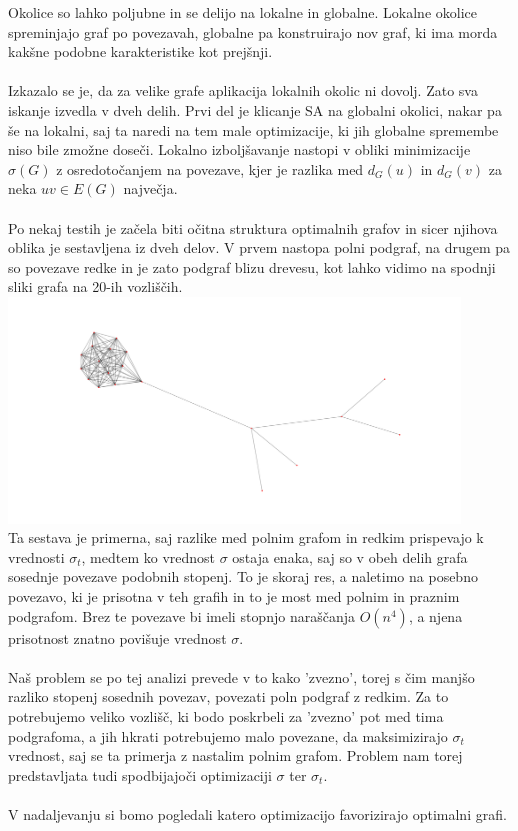 \documentclass[ letterpaper, titlepage, fleqn]{article}
\begin{document}
Okolice so lahko poljubne in se delijo na lokalne in globalne.
Lokalne okolice spreminjajo graf po povezavah, globalne pa
konstruirajo nov graf, ki ima morda kakšne podobne karakteristike kot prejšnji.
\\\\
Izkazalo se je, da za velike grafe aplikacija lokalnih okolic ni dovolj. Zato
sva iskanje izvedla v dveh delih. Prvi del je klicanje SA na globalni okolici, nakar
pa še na lokalni, saj ta naredi na tem male optimizacije, ki jih globalne spremembe 
niso bile zmožne doseči.
Lokalno izboljšavanje nastopi v obliki minimizacije $\sigma(G)$ z osredotočanjem na
povezave, kjer je razlika med $d_G(u)$ in $d_G(v)$ za neka $uv \in E(G)$ največja.
\\\\
Po nekaj testih je začela biti očitna struktura optimalnih grafov in sicer
njihova oblika je sestavljena iz dveh delov. V prvem nastopa polni podgraf, 
na drugem pa so povezave redke in je zato podgraf blizu drevesu, kot lahko 
vidimo na spodnji sliki grafa na 20-ih vozliščih. \\
\includegraphics[width=\textwidth, height=6cm]{graphics/sample.png} \\
Ta sestava je primerna, saj razlike med polnim grafom in redkim prispevajo 
k vrednosti $\sigma_t$, medtem ko vrednost $\sigma$ ostaja enaka, saj so v obeh
delih grafa sosednje povezave podobnih stopenj. To je skoraj res, a naletimo na posebno povezavo,
ki je prisotna v teh grafih in to je most med polnim in praznim podgrafom. Brez te povezave
bi imeli stopnjo naraščanja $O(n^4)$, a njena prisotnost znatno povišuje vrednost $\sigma$.
\\\\
Naš problem se po tej analizi prevede v to kako 'zvezno', torej s čim manjšo razliko stopenj sosednih povezav, 
povezati poln podgraf z redkim. 
Za to potrebujemo veliko vozlišč, ki bodo poskrbeli za 'zvezno' pot med tima podgrafoma,  
a jih hkrati potrebujemo malo povezane, da maksimizirajo $\sigma_t$ vrednost, saj se ta primerja
z nastalim polnim grafom. Problem nam torej predstavljata tudi spodbijajoči optimizaciji $\sigma$ ter $\sigma_t$.
\\\\
V nadaljevanju si bomo pogledali katero optimizacijo favorizirajo optimalni grafi.
\end{document}
